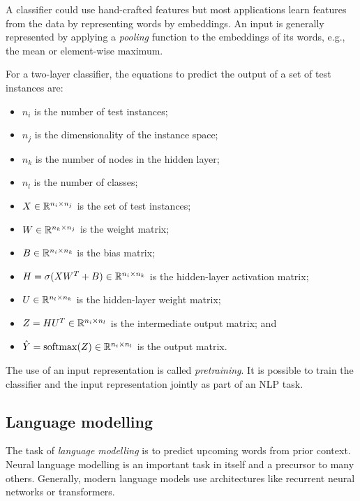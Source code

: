 A classifier could use hand-crafted features but most applications learn
features from the data by representing words by embeddings.
An input is generally represented by applying a \textit{pooling} function to
the embeddings of its words, e.g., the mean or element-wise maximum.

For a two-layer classifier, the equations to predict the output of a set of test
instances are:
\begin{itemize}
  \item $n_i$ is the number of test instances;
  \item $n_j$ is the dimensionality of the instance space;
  \item $n_k$ is the number of nodes in the hidden layer;
  \item $n_l$ is the number of classes;
  \item $X \in \mathbb{R}^{n_i \times n_j}$ is the set of test instances;
  \item $W \in \mathbb{R}^{n_k \times n_j}$ is the weight matrix;
  \item $B \in \mathbb{R}^{n_i \times n_k}$ is the bias matrix;
  \item $H = \sigma(X W^{T} + B) \in \mathbb{R}^{n_i \times n_k}$
        is the hidden-layer activation matrix;
  \item $U \in \mathbb{R}^{n_l \times n_k}$ is the hidden-layer weight matrix;
  \item $Z = H U^{T} \in \mathbb{R}^{n_i \times n_l}$ is the intermediate output matrix; and
  \item $\hat{Y} = \operatorname{softmax}(Z) \in \mathbb{R}^{n_i \times n_l}$ is the output matrix.
\end{itemize}

The use of an input representation is called \textit{pretraining}.
It is possible to train the classifier and the input representation jointly as
part of an NLP task.

\subsection{Language modelling}

The task of \textit{language modelling} is to predict upcoming words from prior
context.
Neural language modelling is an important task in itself and a precursor to
many others.
Generally, modern language models use architectures like recurrent neural
networks or transformers.

